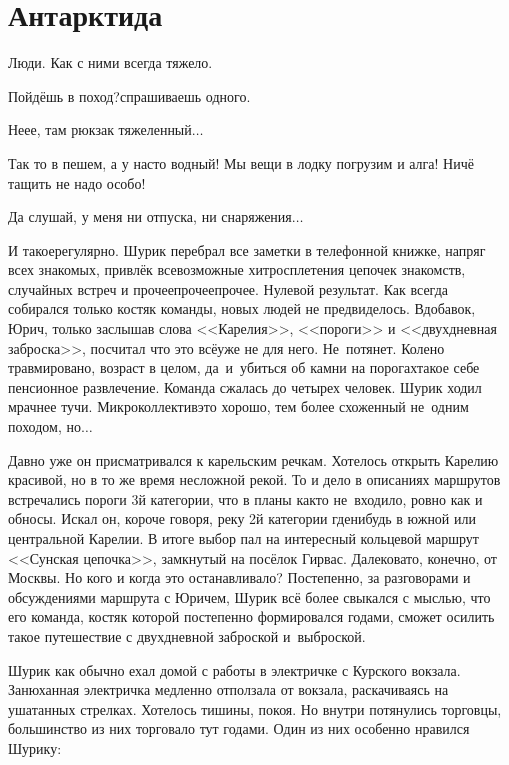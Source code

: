 {
	\chapter{Антарктида}
	\vepsianrose
	
	\fancyhead[LE]{\fancyplain{}{\bfseries \parttitle}}
	\fancyhead[RO]{\fancyplain{}{\bfseries \rightmark}}
	
	Люди. Как с ними всегда тяжело.
	
	\diagdash Пойдёшь в поход?\mdash спрашиваешь одного.
	
	\diagdash Не\sdash е\sdash е, там рюкзак тяжеленный$\ldots$
	
	\diagdash Так то в пешем, а у нас\sdash то водный! Мы вещи в лодку погрузим и алга! Ничё тащить не надо особо!
	
	\diagdash Да слушай, у меня ни отпуска, ни снаряжения$\ldots$
	
	И такое\mdash регулярно. Шурик перебрал все заметки в телефонной книжке, напряг всех знакомых, привлёк всевозможные хитросплетения цепочек знакомств, случайных встреч и прочее\sdash прочее\sdash прочее. Нулевой результат. Как всегда собирался только костяк команды, новых людей не предвиделось. Вдобавок, Юрич, только заслышав слова <<Карелия>>, <<пороги>> и <<двухдневная заброска>>, посчитал что это всё\mdash уже не для него. Не~потянет. Колено травмировано, возраст в целом, да~и~убиться об камни на порогах\mdash такое себе пенсионное развлечение. Команда сжалась до четырех человек. Шурик ходил мрачнее тучи. Микроколлектив\mdash это хорошо, тем более схоженный не~одним походом, но$\ldots$
	
	Давно уже он присматривался к карельским речкам. Хотелось открыть Карелию красивой, но в то же время несложной рекой. То и дело в описаниях маршрутов встречались пороги 3\sdash й категории, что в планы как\sdash то не~входило, ровно как и обносы. Искал он, короче говоря, реку 2\sdash й категории где\sdash нибудь в южной или центральной Карелии. В итоге выбор пал на интересный кольцевой маршрут <<Сунская цепочка>>, замкнутый на посёлок Гирвас. Далековато, конечно, от Москвы. Но кого и когда это останавливало? Постепенно, за разговорами и обсуждениями маршрута с Юричем, Шурик всё более свыкался с мыслью, что его команда, костяк которой постепенно формировался годами, сможет осилить такое путешествие с двухдневной заброской и~выброской. 
	
	Шурик как обычно ехал домой с работы в электричке с Курского вокзала. Занюханная электричка медленно отползала от вокзала, раскачиваясь на ушатанных стрелках. Хотелось тишины, покоя. Но внутри потянулись торговцы, большинство из них торговало тут годами. Один из них особенно нравился Шурику:
	
}
